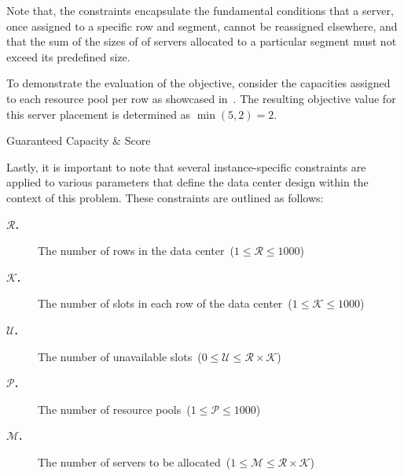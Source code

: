 Note that, the constraints encapsulate the fundamental conditions that a server,
once assigned to a specific row and segment, cannot be reassigned elsewhere, and
that the sum of the sizes of of servers allocated to a particular segment must
not exceed its predefined size.

To demonstrate the evaluation of the objective, consider the capacities assigned
to each resource pool per row as showcased in~.
The resulting objective value for this server placement is determined as
$\min(5, 2) = 2$.

\begin{table}[ht]
  \centering
  
  \caption{Guaranteed Capacity \& Score}
  \label{tab:dc-gc-example}
\end{table}

Lastly, it is important to note that several instance-specific constraints
are applied to various parameters that define the data center design within
the context of this problem. These constraints are outlined as follows:

\begin{description}
  \item[\textbf{$\mathcal{R}$.}] The number of rows in the data center~($ 1 \leq \mathcal{R} \leq 1000$)
  \item[\textbf{$\mathcal{K}$.}] The number of slots in each row of the data center~($ 1 \leq \mathcal{K} \leq 1000$)
  \item[\textbf{$\mathcal{U}$.}] The number of unavailable slots~($ 0 \leq \mathcal{U} \leq \mathcal{R} \times \mathcal{K}$)
  \item[\textbf{$\mathcal{P}$.}] The number of resource pools~($ 1 \leq \mathcal{P} \leq 1000$)
  \item[\textbf{$\mathcal{M}$.}] The number of servers to be allocated~($ 1 \leq \mathcal{M} \leq \mathcal{R} \times \mathcal{K}$)
\end{description}